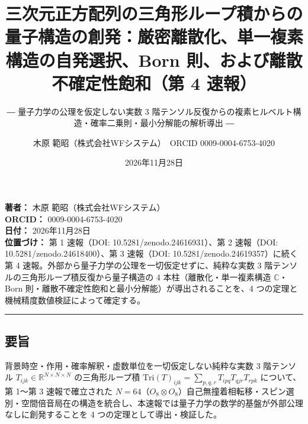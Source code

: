 \documentclass[
  a4paper,
]{ltjsarticle}
\title{三次元正方配列の三角形ループ積からの量子構造の創発：厳密離散化、単一複素構造の自発選択、Born
則、および離散不確定性飽和（第 4 速報）}
\subtitle{― 量子力学の公理を仮定しない実数 3
階テンソル反復からの複素ヒルベルト構造・確率二乗則・最小分解能の解析導出
―}
\author{木原 範昭（株式会社WFシステム）　ORCID 0009-0004-6753-4020}
\date{2026年11月28日}
\begin{document}
\maketitle

\textbf{著者：} 木原 範昭（株式会社WFシステム）\\
\textbf{ORCID：} 0009-0004-6753-4020\\
\textbf{日付：} 2026年11月28日\\
\textbf{位置づけ：} 第 1 速報（DOI: 10.5281/zenodo.24616931）、第 2
速報（DOI: 10.5281/zenodo.24618400）、第 3 速報（DOI:
10.5281/zenodo.24619357）に続く第 4
速報。外部から量子力学の公理を一切仮定せずに、純粋な実数 3
階テンソルの三角形ループ積反復から量子構造の 4
本柱（離散化・単一複素構造 \(\mathbb{C}\)・Born
則・離散不確定性飽和と最小分解能）が導出されることを、4
つの定理と機械精度数値検証によって確定する。

\begin{center}\rule{0.5\linewidth}{0.5pt}\end{center}

\subsection{要旨}\label{ux8981ux65e8}

背景時空・作用・確率解釈・虚数単位を一切仮定しない純粋な実数 3
階テンソル \(T_{ijk} \in \mathbb{R}^{N\times N\times N}\)
の三角形ループ積
\(\mathrm{Tri}(T)_{ijk} = \sum_{p,q,r} T_{ipq} T_{qjr} T_{rpk}\)
について、第 1〜第 3 速報で確立された
\(N = 64\)（\(O_8 \otimes O_8\)）自己無撞着相転移・スピン選別・空間倍音局在の構造を統合し、本速報では量子力学の数学的基盤が外部公理なしに創発することを
4 つの定理として導出・検証した。
\end{document}
